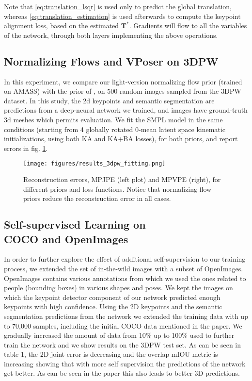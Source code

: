 \documentclass[runningheads]{llncs}
\begin{document}
Note that \eqref{eq:translation_lsqr} is used only to predict the global translation, whereas \eqref{eq:translation_estimation} is used afterwards to compute the keypoint alignment loss, based on the estimated $\mathbf{T}^*$. Gradients will flow to all the variables of the network, through both layers implementing the above operations.

\subsection{Normalizing Flows and VPoser on 3DPW}

In this experiment, we compare our light-version normalizing flow prior (trained on AMASS) with the prior of \cite{pavlakoscvpr2019}, on 500 random images sampled from the 3DPW dataset. In this study, the 2d keypoints and semantic segmentation are predictions from a deep-neural network we trained, and images have ground-truth 3d meshes which permits evaluation. We fit the SMPL model in the same conditions (starting from 4 globally rotated 0-mean latent space kinematic initializations, using both KA and KA+BA losses), for both priors, and report errors in fig. \ref{fig:3dpw_fitting}.

\begin{figure}[!ht]
\begin{center}
    \texttt{[image: figures/results\_3dpw\_fitting.png]}
\end{center}
\caption{Reconstruction errors, MPJPE (left plot) and MPVPE (right), for different priors and loss functions. Notice that normalizing flow priors reduce the reconstruction error in all cases.}
\label{fig:3dpw_fitting}
\end{figure}    

\subsection{Self-supervised Learning on\\COCO and OpenImages}

In order to further explore the effect of additional self-supervision to our training process, we extended the set of in-the-wild images with a subset of OpenImages\cite{OpenImages}. OpenImages contains various annotations from which we used the ones related to people (bounding boxes) in various shapes and poses. We kept the images on which the keypoint detector component of our network predicted enough keypoints with high confidence. Using the 2D keypoints and the semantic segmentation predictions from the network we extended the training data with up to 70,000 samples, including the initial COCO data mentioned in the paper. We gradually increased the amount of data from 10\% up to 100\% used to further train the network and we show results on the 3DPW test set. As can be seen in table 1, the 2D joint error is decreasing and the overlap mIOU metric is increasing showing that with more self supervision the predictions of the network get better. As can be seen in the paper this also leads to better 3D predictions.
\end{document}

